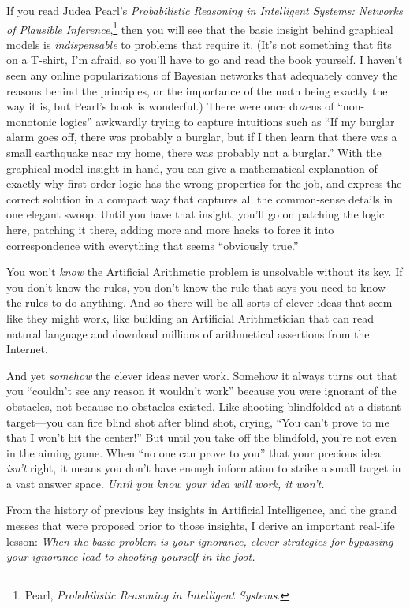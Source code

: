 {
 If you read Judea Pearl's \textit{Probabilistic
Reasoning in Intelligent Systems: Networks of Plausible
Inference},\footnote{Pearl, \textit{Probabilistic Reasoning in Intelligent
Systems}.} then you will see that the basic insight
behind graphical models is \textit{indispensable} to problems that
require it. (It's not something that fits on a T-shirt,
I'm afraid, so you'll have to go and
read the book yourself. I haven't seen any online
popularizations of Bayesian networks that adequately convey the reasons
behind the principles, or the importance of the math being exactly the
way it is, but Pearl's book is wonderful.) There were
once dozens of ``non-monotonic
logics'' awkwardly trying to capture intuitions such
as ``If my burglar alarm goes off, there was probably
a burglar, but if I then learn that there was a small earthquake near
my home, there was probably not a burglar.'' With the
graphical-model insight in hand, you can give a mathematical
explanation of exactly why first-order logic has the wrong properties
for the job, and express the correct solution in a compact way that
captures all the common-sense details in one elegant swoop. Until you
have that insight, you'll go on patching the logic
here, patching it there, adding more and more hacks to force it into
correspondence with everything that seems ``obviously
true.''}

{
 You won't \textit{know} the Artificial Arithmetic
problem is unsolvable without its key. If you don't
know the rules, you don't know the rule that says you
need to know the rules to do anything. And so there will be all sorts
of clever ideas that seem like they might work, like building an
Artificial Arithmetician that can read natural language and download
millions of arithmetical assertions from the Internet.}

{
 And yet \textit{somehow} the clever ideas never work. Somehow it
always turns out that you ``couldn't
see any reason it wouldn't work''
because you were ignorant of the obstacles, not because no obstacles
existed. Like shooting blindfolded at a distant target---you can fire
blind shot after blind shot, crying, ``You
can't prove to me that I won't hit the
center!'' But until you take off the blindfold,
you're not even in the aiming game. When
``no one can prove to you'' that
your precious idea \textit{isn't} right, it means you
don't have enough information to strike a small target
in a vast answer space. \textit{Until you know your idea will work, it
won't.}}

{
 From the history of previous key insights in Artificial
Intelligence, and the grand messes that were proposed prior to those
insights, I derive an important real-life lesson: \textit{When the
basic problem is your ignorance, clever strategies for bypassing your
ignorance lead to shooting yourself in the foot.}}

